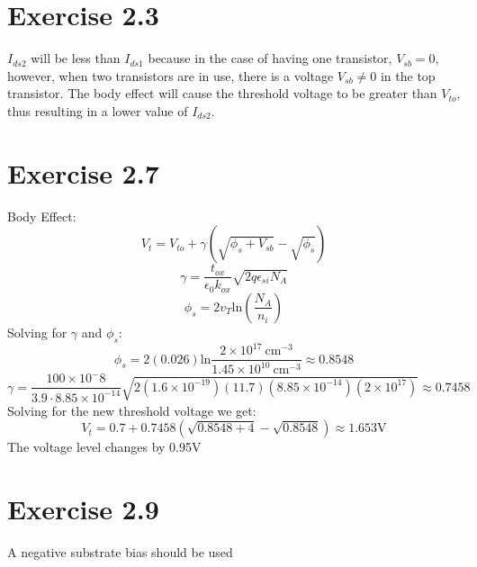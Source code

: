 \documentclass[11pt]{article}
\begin{document}
\section{Exercise 2.3}
$I_{ds2}$ will be less than $I_{ds1}$ because in the case of having one transistor, $V_{sb} = 0$, however, when two transistors are in use, there is a voltage $V_{sb} \ne 0$ in the top transistor. The body effect will cause the threshold voltage to be greater than $V_{to}$, thus resulting in a lower value of $I_{ds2}$.
\section{Exercise 2.7}
Body Effect: $$V_t = V_{to}+ \gamma (\sqrt{\phi _s + V_{sb}} - \sqrt{\phi _s})$$
$$\gamma = \frac{t_{ox}}{\epsilon _ {0} k_{ox}} \sqrt{2q \epsilon _{si} N_A}$$
$$\phi _s = 2 v_T \textrm{ln}(\frac{N_A}{n_i})$$
Solving for $\gamma$ and $\phi _s$:
$$\phi _s = 2(0.026)\textrm{ln}\frac{2 \times 10^{17} ~\textrm{cm}^{-3}}{1.45 \times 10^{10}~\textrm{cm}^{-3}} \approx 0.8548$$
$$\gamma = \frac{100 \times 10^-8}{3.9 \cdot 8.85 \times 10^{-14}}\sqrt{2(1.6 \times 10^{-19})(11.7)(8.85 \times 10^{-14})(2 \times 10^{17})} \approx 0.7458$$
Solving for the new threshold voltage we get:
$$V_t = 0.7 + 0.7458(\sqrt{0.8548 +4} -\sqrt{0.8548}) \approx 1.653\textrm{V}$$
The voltage level changes by 0.95V
\section{Exercise 2.9}
A negative substrate bias should be used
\end{document}
